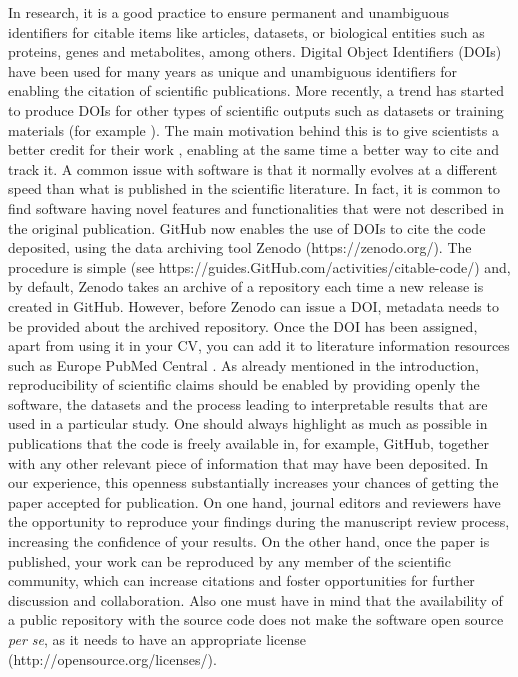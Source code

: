 \documentclass[10pt,letterpaper]{article}
\begin{document}
In research, it is a good practice to ensure permanent and unambiguous
identifiers for citable items like articles, datasets, or biological
entities such as proteins, genes and metabolites, among others. Digital
Object Identifiers (DOIs) have been used for many years as unique and
unambiguous identifiers for enabling the citation of scientific
publications. More recently, a trend has started to produce DOIs for
other types of scientific outputs such as datasets \cite{Vizcaino:2014}
or training materials (for example \cite{Ahmadia_2015_27353}). The main
motivation behind this is to give scientists a better credit for their
work \cite{NatBiotechEditorial:2009}, enabling at the same time a better
way to cite and track it. A common issue with software is that it
normally evolves at a different speed than what is published in the
scientific literature. In fact, it is common to find software having
novel features and functionalities that were not described in the
original publication. GitHub now enables the use of DOIs to cite the
code deposited, using the data archiving tool Zenodo
(https://zenodo.org/). The procedure is simple (see
https://guides.GitHub.com/activities/citable-code/) and, by default,
Zenodo takes an archive of a repository each time a new release is
created in GitHub. However, before Zenodo can issue a DOI, metadata
needs to be provided about the archived repository. Once the DOI has
been assigned, apart from using it in your CV, you can add it to
literature information resources such as Europe PubMed Central
\cite{EuropePMCConsortium:2015}. As already mentioned in the
introduction, reproducibility of scientific claims should be enabled by
providing openly the software, the datasets and the process leading to
interpretable results that are used in a particular study. One should
always highlight as much as possible in publications that the code is
freely available in, for example, GitHub, together with any other
relevant piece of information that may have been deposited. In our
experience, this openness substantially increases your chances of
getting the paper accepted for publication. On one hand, journal editors
and reviewers have the opportunity to reproduce your findings during the
manuscript review process, increasing the confidence of your results. On
the other hand, once the paper is published, your work can be reproduced
by any member of the scientific community, which can increase citations
and foster opportunities for further discussion and collaboration. Also
one must have in mind that the availability of a public repository with
the source code does not make the software open source \emph{per se}, as
it needs to have an appropriate license
(http://opensource.org/licenses/).
\end{document}
